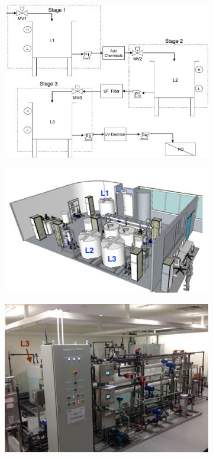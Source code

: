 {\begin{figure}[htb]
  \centering
  \begin{subfigure}[b]{.65\linewidth}
  \includegraphics[width=\linewidth]{Figures/SWaT_allTanks-Stages}
  \end{subfigure}
  \begin{subfigure}[b]{.35\linewidth}
  \includegraphics[width=\linewidth]{Figures/testbed.png}
  \end{subfigure}
  \begin{subfigure}[b]{.35\linewidth}
  \includegraphics[width=\linewidth]{Figures/testbed2.png}
  \end{subfigure}
  

\end{figure}}
